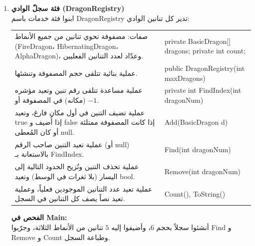 \documentclass[14pt]{extarticle}
\begin{document}
\begin{enumerate}[resume, label=\textbf{تمرين \arabic*:}, wide=0pt, leftmargin=*, itemsep=2.2em]

    \item \textbf{فئة سجلّ الوادي (\textenglish{DragonRegistry})} \\
    ابنوا فئة خدمات باسم \textenglish{DragonRegistry} تدير كل تنانين الوادي:

    {\centering
    \renewcommand{\arraystretch}{1.2}
    \small
    \begin{tabular}{|>{\raggedleft\arraybackslash}p{}|>{\raggedright\arraybackslash}p{}|}
    \hline
    \multicolumn{2}{|c|}{\textbf{الفئة: \textenglish{DragonRegistry}}} \\
    \hline
    صفات: مصفوفة تحوي تنانين من جميع الأنماط (\textenglish{FireDragon}، \textenglish{HibernatingDragon}، \textenglish{AlphaDragon})، وعدّاد لعدد التنانين الفعليين. & \textenglish{private BasicDragon[] dragons;} \newline \textenglish{private int count;} \\
    \hline
    عملية بنائية تتلقى حجم المصفوفة وتنشئها. & \textenglish{public DragonRegistry(int maxDragons)} \\
    \hline
    عملية مساعدة تتلقى رقم تنين وتعيد مؤشره (مكانه) في المصفوفة أو $-1$. & \textenglish{private int FindIndex(int dragonNum)} \\
    \hline
    عملية تضيف التنين في أول مكان فارغ، وتعيد \textenglish{true} إذا أُضيف و \textenglish{false} إذا كانت المصفوفة ممتلئة أو كان المُعطى \textenglish{null}. & \textenglish{Add(BasicDragon d)} \\
    \hline
    عملية تعيد التنين صاحب الرقم (أو \textenglish{null}) بالاستعانة بـ \textenglish{FindIndex}. & \textenglish{Find(int dragonNum)} \\
    \hline
    عملية تحذف التنين وتُزيح الحدود التالية إلى اليسار (بلا ثغرات في الوسط) وتعيد \textenglish{bool}. & \textenglish{Remove(int dragonNum)} \\
    \hline
    عملية تعيد عدد التنانين الموجودين فعلياً، وعملية تعيد نصاً يصف كل التنانين في السجل. & \textenglish{Count(), ToString()} \\
    \hline
    \end{tabular}
    \par} %

    \vspace{2em}
    \noindent \textbf{الفحص في \textenglish{Main}:} \\
    أنشئوا سجلاً بحجم $6$، وأضيفوا إليه $5$ تنانين من الأنماط الثلاثة، وجرّبوا \textenglish{Find} و \textenglish{Remove} و \textenglish{Count} وطباعة السجل.


\end{enumerate}
\end{document}
